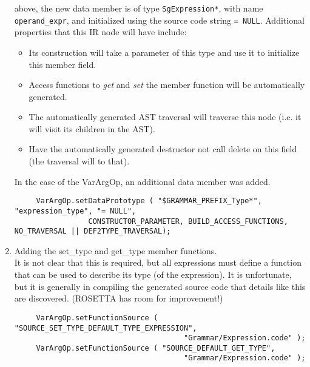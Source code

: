 \begin{enumerate}
           above, the new data member is of type {\tt SgExpression*}, with name
           {\tt operand\_expr}, and initialized using the source code string {\tt = NULL}.
           Additional properties that this IR node will have include:
           \begin{itemize}
                \item Its construction will take a parameter of this type and 
                      use it to initialize this member field.
                \item Access functions to {\it get} and {\it set} the member 
                      function will be automatically generated.
                \item The automatically generated AST traversal will traverse 
                      this node (i.e. it will visit its children in the AST).
                \item Have the automatically generated destructor not call 
                      delete on this field (the traversal will to that).
           \end{itemize}
           In the case of the VarArgOp, an additional data member was added.
{\indent
{\mySmallFontSize
\begin{verbatim}
     VarArgOp.setDataPrototype ( "$GRAMMAR_PREFIX_Type*", "expression_type", "= NULL",
				 CONSTRUCTOR_PARAMETER, BUILD_ACCESS_FUNCTIONS, NO_TRAVERSAL || DEF2TYPE_TRAVERSAL);
\end{verbatim} 
}}

     \item Adding the set\_type and get\_type member functions. \\
           It is not clear that this is required, but all expressions must define a
           function that can be used to describe its type (of the expression).
           It is unfortunate, but it is generally in compiling the generated source code
           that details like this are discovered.  (ROSETTA has room for improvement!)
{\indent
{\mySmallFontSize
\begin{verbatim}
     VarArgOp.setFunctionSource ( "SOURCE_SET_TYPE_DEFAULT_TYPE_EXPRESSION", 
                                       "Grammar/Expression.code" );
     VarArgOp.setFunctionSource ( "SOURCE_DEFAULT_GET_TYPE",
                                       "Grammar/Expression.code" );
\end{verbatim} 
}}


\end{enumerate}

